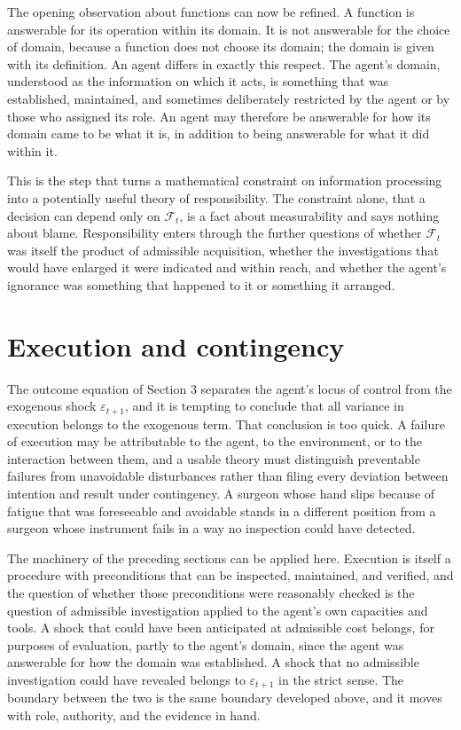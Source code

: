 \documentclass[11pt]{article}
\newcommand{\F}{\mathcal F}
\theoremstyle{definition}
\begin{document}
The opening observation about functions can now be refined. A function is answerable for its operation within its domain. It is not answerable for the choice of domain, because a function does not choose its domain; the domain is given with its definition. An agent differs in exactly this respect. The agent's domain, understood as the information on which it acts, is something that was established, maintained, and sometimes deliberately restricted by the agent or by those who assigned its role. An agent may therefore be answerable for how its domain came to be what it is, in addition to being answerable for what it did within it.

This is the step that turns a mathematical constraint on information processing into a potentially useful theory of responsibility. The constraint alone, that a decision can depend only on $\F_t$, is a fact about measurability and says nothing about blame. Responsibility enters through the further questions of whether $\F_t$ was itself the product of admissible acquisition, whether the investigations that would have enlarged it were indicated and within reach, and whether the agent's ignorance was something that happened to it or something it arranged.

\section{Execution and contingency}

The outcome equation of Section 3 separates the agent's locus of control from the exogenous shock $\varepsilon_{t+1}$, and it is tempting to conclude that all variance in execution belongs to the exogenous term. That conclusion is too quick. A failure of execution may be attributable to the agent, to the environment, or to the interaction between them, and a usable theory must distinguish preventable failures from unavoidable disturbances rather than filing every deviation between intention and result under contingency. A surgeon whose hand slips because of fatigue that was foreseeable and avoidable stands in a different position from a surgeon whose instrument fails in a way no inspection could have detected.

The machinery of the preceding sections can be applied here. Execution is itself a procedure with preconditions that can be inspected, maintained, and verified, and the question of whether those preconditions were reasonably checked is the question of admissible investigation applied to the agent's own capacities and tools. A shock that could have been anticipated at admissible cost belongs, for purposes of evaluation, partly to the agent's domain, since the agent was answerable for how the domain was established. A shock that no admissible investigation could have revealed belongs to $\varepsilon_{t+1}$ in the strict sense. The boundary between the two is the same boundary developed above, and it moves with role, authority, and the evidence in hand.
\end{document}
